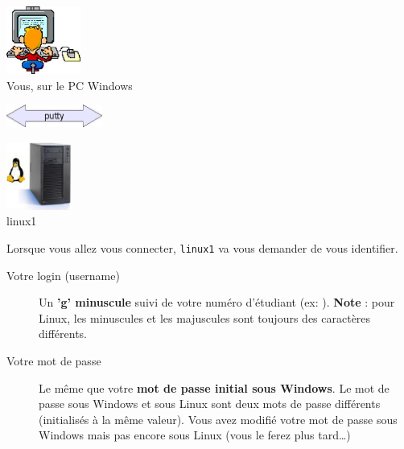 \documentclass[a4paper,11pt]{style-esi/td}
\begin{document}
		\begin{colxbox}[colback=white,halign=center,drop fuzzy shadow]
		\begin{centering}
			\begin{minipage}{10em}
				\centering
				\includegraphics[height=6em]{images/putty1}\\
				{\footnotesize Vous, sur le PC Windows}
			\end{minipage}
			\qquad
			\begin{minipage}{8em}
				\centering
				\includegraphics[height=2em]{images/putty2}
			\end{minipage}
			\qquad
			\begin{minipage}{10em}
				\centering
				\includegraphics[height=6em]{images/putty3}\\
				{\footnotesize linux1}
			\end{minipage}
		\end{centering}
		\end{colxbox}

		\bigskip
		Lorsque vous allez vous connecter, \verb_linux1_ va vous demander de vous identifier.

		\begin{infobox}
			\begin{description}
			\item[Votre login (username)]
				Un \textbf{'g' minuscule} suivi de votre numéro d'étudiant
				(ex: ).
				\textbf{Note} : pour Linux, les minuscules et les majuscules 
				sont toujours des caractères différents.
			\item[Votre mot de passe]
				Le même que votre \textbf{mot de passe initial sous Windows}.			
				Le mot de passe sous Windows et sous Linux sont deux mots de passe différents 
				(initialisés à la même valeur).        
				Vous avez modifié votre mot de passe sous Windows 
				mais pas encore sous Linux (vous le ferez plus tard\dots)
			\end{description}
		\end{infobox}
\end{document}
